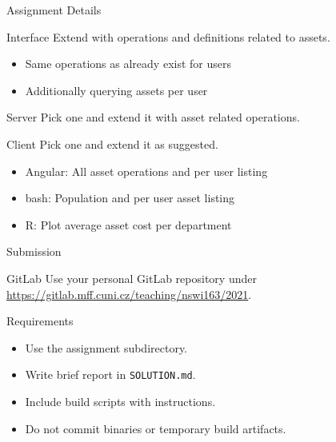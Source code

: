 \begin{frame}{Assignment Details}
    \begin{block}{Interface}
        Extend with operations and definitions related to assets.
        \begin{itemize}
            \item Same operations as already exist for users
            \item Additionally querying assets per user
        \end{itemize}
    \end{block}

    \medskip

    \begin{block}{Server}
        Pick one and extend it with asset related operations.
    \end{block}

    \medskip

    \begin{block}{Client}
        Pick one and extend it as suggested.
        \begin{itemize}
            \item Angular: All asset operations and per user listing
            \item bash: Population and per user asset listing
            \item R: Plot average asset cost per department
        \end{itemize}
    \end{block}
\end{frame}


\begin{frame}{Submission}
    \begin{block}{GitLab}
        Use your personal GitLab repository under \\
        \url{https://gitlab.mff.cuni.cz/teaching/nswi163/2021}.
    \end{block}
    \begin{block}{Requirements}
        \begin{itemize}
            \item Use the assignment subdirectory.
            \item Write brief report in \lstinline{SOLUTION.md}.
            \item Include build scripts with instructions.
            \item Do not commit binaries or temporary build artifacts.
        \end{itemize}
    \end{block}
\end{frame}


